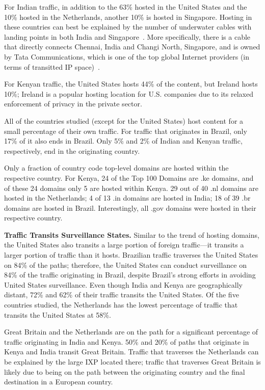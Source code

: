 For Indian traffic, in addition to the 63\% hosted in the United States and the 10\% hosted in the Netherlands, another 10\% is hosted in Singapore.  Hosting in these countries can best be explained by the number of underwater cables with landing points in both India and Singapore~\cite{cablemap}.  More specifically, there is a cable that directly connects Chennai, India and Changi North, Singapore, and is owned by Tata Communications, which is one of the top global Internet providers (in terms of transitted IP space)~\cite{bakers}.  

For Kenyan traffic, the United States hosts 44\% of the content, but Ireland hosts 10\%; Ireland is a popular hosting location for U.S. companies due to its relaxed enforcement of privacy in the private sector.  

All of the countries studied (except for the United States) host content for a small percentage of their own traffic.  For traffic that originates in Brazil, only 17\% of it also ends in Brazil.  Only 5\% and 2\% of Indian and Kenyan traffic, respectively, end in the originating country.  

Only a fraction of country code top-level domains are hosted within the respective country.  For Kenya, 24 of the Top 100 Domains are .ke domains, and of these 24 domains only 5 are hosted within Kenya.  29 out of 40 .nl domains are hosted in the Netherlands; 4 of 13 .in domains are hosted in India; 18 of 39 .br domains are hosted in Brazil.  Interestingly, all .gov domains were hosted in their respective country.

{\bf Traffic Transits Surveillance States.}
Similar to the trend of hosting domains, the United States also transits a large portion of foreign traffic---it transits a larger portion of traffic than it hosts.  Brazilian traffic traverses the United States on 84\% of the paths; therefore, the United States can conduct surveillance on 84\% of the traffic originating in Brazil, despite Brazil's strong efforts in avoiding United States surveillance.  Even though India and Kenya are geographically distant, 72\% and 62\% of their traffic transits the United States.  Of the five countries studied, the Netherlands has the lowest percentage of traffic that transits the United States at 58\%.  

Great Britain and the Netherlands are on the path for a significant percentage of traffic originating in India and Kenya.  50\% and 20\% of paths that originate in Kenya and India transit Great Britain.  Traffic that traverses the Netherlands can be explained by the large IXP located there; traffic that traverses Great Britain is likely due to being on the path between the originating country and the final destination in a European country.

